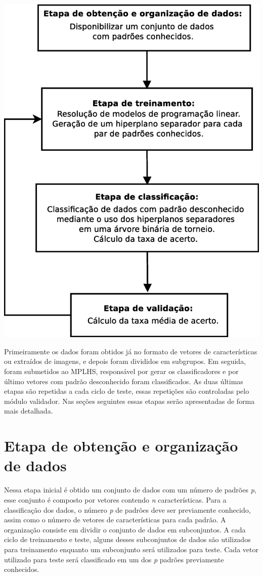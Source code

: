 \begin{center}
	\includegraphics[scale=0.5]{graficos/Diagrama_etapas}
	\label{img:diagrama_modulos}
\end{center}

Primeiramente os dados foram obtidos já no formato de vetores de características ou  extraídos de imagens, e depois foram divididos em subgrupos. Em seguida, foram submetidos ao MPLHS, responsável por gerar os classificadores e por último vetores com padrão desconhecido foram classificados. As duas últimas etapas são repetidas a cada ciclo de teste, essas repetições são controladas pelo módulo validador. Nas seções seguintes essas etapas serão apresentadas de forma mais detalhada.

\section{Etapa de obtenção e organização de dados}
Nessa etapa inicial é obtido um conjunto de dados com um número de padrões \textit{p}, esse conjunto é composto por vetores contendo \textit{n} características. Para a classificação dos dados, o número \textit{p} de padrões deve ser previamente conhecido, assim como o número de vetores de características para cada padrão. 
A organização consiste em dividir o conjunto de dados em subconjuntos. A cada ciclo de treinamento e teste, alguns desses subconjuntos de dados são utilizados para treinamento enquanto um subconjunto será utilizados para teste. Cada vetor utilizado para teste será classificado em um dos \textit{p} padrões previamente conhecidos.

